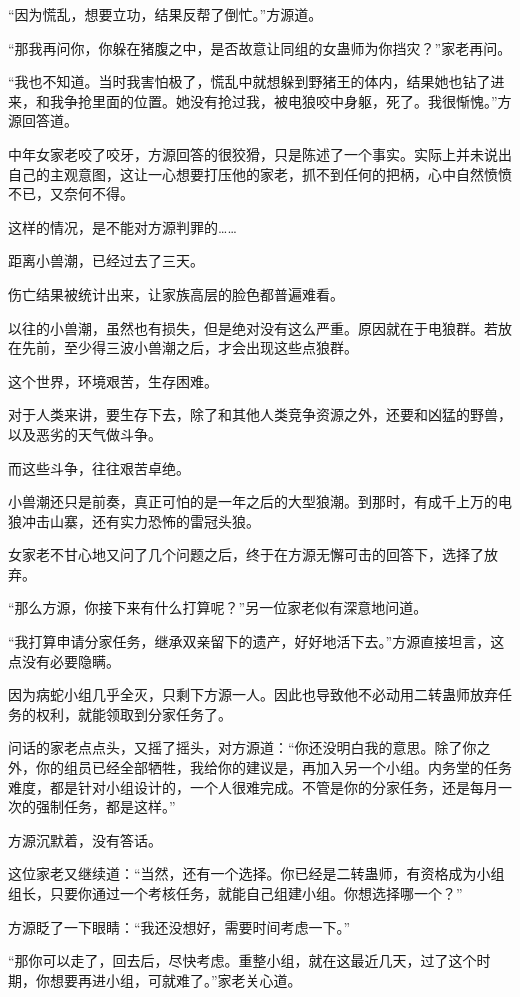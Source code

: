\begin{this_body}
“因为慌乱，想要立功，结果反帮了倒忙。”方源道。

“那我再问你，你躲在猪腹之中，是否故意让同组的女蛊师为你挡灾？”家老再问。

“我也不知道。当时我害怕极了，慌乱中就想躲到野猪王的体内，结果她也钻了进来，和我争抢里面的位置。她没有抢过我，被电狼咬中身躯，死了。我很惭愧。”方源回答道。

中年女家老咬了咬牙，方源回答的很狡猾，只是陈述了一个事实。实际上并未说出自己的主观意图，这让一心想要打压他的家老，抓不到任何的把柄，心中自然愤愤不已，又奈何不得。

这样的情况，是不能对方源判罪的……

距离小兽潮，已经过去了三天。

伤亡结果被统计出来，让家族高层的脸色都普遍难看。

以往的小兽潮，虽然也有损失，但是绝对没有这么严重。原因就在于电狼群。若放在先前，至少得三波小兽潮之后，才会出现这些点狼群。

这个世界，环境艰苦，生存困难。

对于人类来讲，要生存下去，除了和其他人类竞争资源之外，还要和凶猛的野兽，以及恶劣的天气做斗争。

而这些斗争，往往艰苦卓绝。

小兽潮还只是前奏，真正可怕的是一年之后的大型狼潮。到那时，有成千上万的电狼冲击山寨，还有实力恐怖的雷冠头狼。

女家老不甘心地又问了几个问题之后，终于在方源无懈可击的回答下，选择了放弃。

“那么方源，你接下来有什么打算呢？”另一位家老似有深意地问道。

“我打算申请分家任务，继承双亲留下的遗产，好好地活下去。”方源直接坦言，这点没有必要隐瞒。

因为病蛇小组几乎全灭，只剩下方源一人。因此也导致他不必动用二转蛊师放弃任务的权利，就能领取到分家任务了。

问话的家老点点头，又摇了摇头，对方源道：“你还没明白我的意思。除了你之外，你的组员已经全部牺牲，我给你的建议是，再加入另一个小组。内务堂的任务难度，都是针对小组设计的，一个人很难完成。不管是你的分家任务，还是每月一次的强制任务，都是这样。”

方源沉默着，没有答话。

这位家老又继续道：“当然，还有一个选择。你已经是二转蛊师，有资格成为小组组长，只要你通过一个考核任务，就能自己组建小组。你想选择哪一个？”

方源眨了一下眼睛：“我还没想好，需要时间考虑一下。”

“那你可以走了，回去后，尽快考虑。重整小组，就在这最近几天，过了这个时期，你想要再进小组，可就难了。”家老关心道。


\end{this_body}
